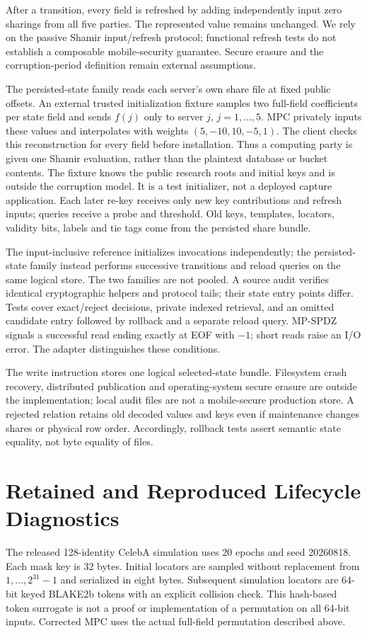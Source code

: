 \documentclass[journal,onecolumn]{IEEEtran}
\begin{document}
After a transition, every field is refreshed by adding independently input zero sharings from all five parties. The represented value remains unchanged. We rely on the passive Shamir input/refresh protocol; functional refresh tests do not establish a composable mobile-security guarantee. Secure erasure and the corruption-period definition remain external assumptions.

The persisted-state family reads each server's own share file at fixed public offsets. An external trusted initialization fixture samples two full-field coefficients per state field and sends $f(j)$ only to server $j$, $j=1,\ldots,5$. MPC privately inputs these values and interpolates with weights $(5,-10,10,-5,1)$. The client checks this reconstruction for every field before installation. Thus a computing party is given one Shamir evaluation, rather than the plaintext database or bucket contents. The fixture knows the public research roots and initial keys and is outside the corruption model. It is a test initializer, not a deployed capture application. Each later re-key receives only new key contributions and refresh inputs; queries receive a probe and threshold. Old keys, templates, locators, validity bits, labels and tie tags come from the persisted share bundle.

The input-inclusive reference initializes invocations independently; the persisted-state family instead performs successive transitions and reload queries on the same logical store. The two families are not pooled. A source audit verifies identical cryptographic helpers and protocol tails; their state entry points differ. Tests cover exact/reject decisions, private indexed retrieval, and an omitted candidate entry followed by rollback and a separate reload query. MP-SPDZ signals a successful read ending exactly at EOF with $-1$; short reads raise an I/O error. The adapter distinguishes these conditions.

The write instruction stores one logical selected-state bundle. Filesystem crash recovery, distributed publication and operating-system secure erasure are outside the implementation; local audit files are not a mobile-secure production store. A rejected relation retains old decoded values and keys even if maintenance changes shares or physical row order. Accordingly, rollback tests assert semantic state equality, not byte equality of files.

\section{Retained and Reproduced Lifecycle Diagnostics}
The released 128-identity CelebA simulation uses 20 epochs and seed 20260818. Each mask key is 32 bytes. Initial locators are sampled without replacement from $1,\ldots,2^{31}-1$ and serialized in eight bytes. Subsequent simulation locators are 64-bit keyed BLAKE2b tokens with an explicit collision check. This hash-based token surrogate is not a proof or implementation of a permutation on all 64-bit inputs. Corrected MPC uses the actual full-field permutation described above.
\end{document}
